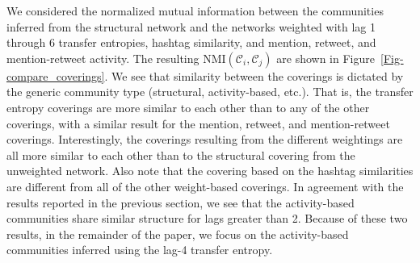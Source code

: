 We considered the normalized mutual information between the communities inferred from the structural network and the networks weighted with lag 1 through 6 transfer entropies, hashtag similarity, and mention, retweet, and mention-retweet activity. The resulting $\text{NMI}(\mathcal{C}_{i}, \mathcal{C}_{j})$ are shown in Figure~\ref{Fig-compare_coverings}. We see that similarity between the coverings is dictated by the generic community type (structural, activity-based, etc.). That is, the transfer entropy coverings are more similar to each other than to any of the other coverings, with a similar result for the mention, retweet, and mention-retweet coverings. Interestingly, the coverings resulting from the different weightings are all more similar to each other than to the structural covering from the unweighted network. Also note that the covering based on the hashtag similarities are different from all of the other weight-based coverings. In agreement with the results reported in the previous section, we see that the activity-based communities share similar structure for lags greater than 2. Because of these two results, in the remainder of the paper, we focus on the activity-based communities inferred using the lag-4 transfer entropy.

